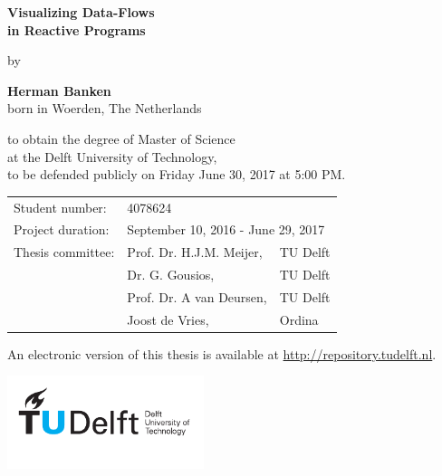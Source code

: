\begin{minipage}[t][0.99\textheight]{0.99\textwidth}
    \begin{center}
        \vspace*{1cm}
        
        \Huge
        \textbf{Visualizing Data-Flows \\in Reactive Programs}
        
        \large
		\vspace{0.5cm}
		by
        \vspace{0.5cm}
        
        \Large
        \textbf{Herman Banken}\\
		\normalsize
        born in Woerden, The Netherlands
        
        \vspace{1cm}
        \vfill

		to obtain the degree of Master of Science\\
		at the Delft University of Technology,\\
		to be defended publicly on Friday June 30, 2017 at 5:00 PM.
        
        \vspace{0.8cm}
                
		\begin{tabular}{l l l}
		Student number:     & \multicolumn{2}{l}{4078624} \\
		Project duration:   & \multicolumn{2}{l}{September 10, 2016 - June 29, 2017} \\
		Thesis committee:   & Prof. Dr. H.J.M. Meijer, 	& TU Delft \\
    						& Dr. G. Gousios,           & TU Delft \\
    						& Prof. Dr. A van Deursen,  & TU Delft \\
    						& Joost de Vries,           & Ordina
		\end{tabular}

        \vspace{0.8cm}

		An electronic version of this thesis is available at \url{http://repository.tudelft.nl}.

        \includegraphics[width=5.76cm,height=2.72cm,natwidth=576,natheight=272]{images/logo.pdf}
    \end{center}
\end{minipage}